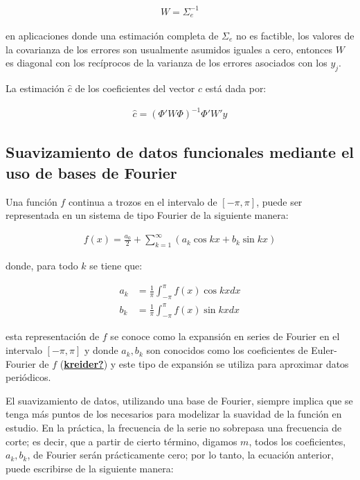 \documentclass[
]{book}
\begin{document}
\begin{align}
    W=\Sigma_e^{-1}
\end{align}

en aplicaciones donde una estimación completa de \(\Sigma_e\) no es factible, los valores de la covarianza de los errores son usualmente asumidos iguales a cero, entonces \(W\) es diagonal con los recíprocos de la varianza de los errores asociados con los \(y_j\).

La estimación \({\hat{c}}\) de los coeficientes del vector \(c\) está dada por:

\begin{align}
    {\hat{c}}=(\Phi'W\Phi)^{-1}\Phi'W'y
\end{align}

\hypertarget{suavizamiento-de-datos-funcionales-mediante-el-uso-de-bases-de-fourier}{%
\subsection*{Suavizamiento de datos funcionales mediante el uso de bases de Fourier}\label{suavizamiento-de-datos-funcionales-mediante-el-uso-de-bases-de-fourier}}

Una función \(f\) continua a trozos en el intervalo de \([-\pi,\pi]\), puede ser representada en un sistema de tipo Fourier de la siguiente manera:

\begin{align}
    f(x)=\frac{a_0}{2}+\sum_{k=1}^\infty(a_k\cos{kx}+b_k\sin{kx})
\end{align}

donde, para todo \(k\) se tiene que:

\begin{align}
    a_k&=\frac{1}{\pi}\int_{-\pi}^\pi f(x)\cos{kx}dx\\
    b_k&=\frac{1}{\pi}\int_{-\pi}^\pi f(x) \sin{kx}dx
\end{align}

esta representación de \(f\) se conoce como la expansión en series de Fourier en el intervalo \([-\pi,\pi]\) y donde \(a_k,b_k\) son conocidos como los coeficientes de Euler-Fourier de \(f\) (\protect\hyperlink{ref-kreider}{\textbf{kreider?}}) y este tipo de expansión se utiliza para aproximar datos periódicos.

El suavizamiento de datos, utilizando una base de Fourier, siempre implica que se tenga más puntos de los necesarios para modelizar la suavidad de la función en estudio. En la práctica, la frecuencia de la serie no sobrepasa una frecuencia de corte; es decir, que a partir de cierto término, digamos \(m\), todos los coeficientes, \(a_k, b_k\), de Fourier serán prácticamente cero; por lo tanto, la ecuación anterior, puede escribirse de la siguiente manera:
\end{document}
